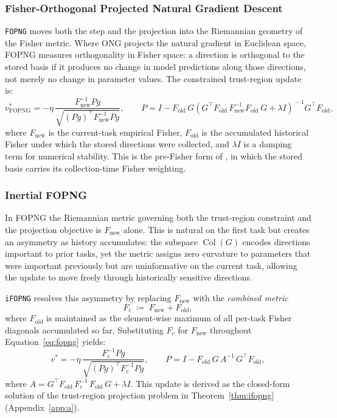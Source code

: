 \subsubsection{Fisher-Orthogonal Projected Natural Gradient Descent}
\texttt{FOPNG} \citep{garg_fisher-orthogonal_2026} moves both the step
and the projection into the Riemannian geometry of the Fisher metric.
Where ONG projects the natural gradient in Euclidean space, FOPNG measures
orthogonality in Fisher space: a direction is orthogonal to the stored
basis if it produces no change in model predictions along those directions,
not merely no change in parameter values.
The constrained trust-region update is:
\begin{equation}
    v^*_{\mathrm{FOPNG}} = -\eta\,
    \frac{F^{-1}_{\mathrm{new}} Pg}{\sqrt{(Pg)^\top F^{-1}_{\mathrm{new}} Pg}},
    \qquad
    P = I - F_{\mathrm{old}}\, G\!\left(G^\top F_{\mathrm{old}}\,
        F^{-1}_{\mathrm{new}} F_{\mathrm{old}}\, G
        + \lambda I\right)^{\!-1}\! G^\top F_{\mathrm{old}},
    \label{eq:fopng}
\end{equation}
where $F_{\mathrm{new}}$ is the current-task empirical Fisher,
$F_{\mathrm{old}}$ is the accumulated historical Fisher under which the
stored directions were collected, and $\lambda I$ is a damping term for
numerical stability.
This is the pre-Fisher form of \citet{garg_fisher-orthogonal_2026}, in
which the stored basis carries its collection-time Fisher weighting.

\subsubsection{Inertial FOPNG}
\label{sec:ifopng}

In FOPNG the Riemannian metric governing both the trust-region constraint
and the projection objective is $F_{\mathrm{new}}$ alone.
This is natural on the first task but creates an asymmetry as history
accumulates: the subspace $\operatorname{Col}(G)$ encodes directions
important to prior tasks, yet the metric assigns zero curvature to
parameters that were important previously but are uninformative on the
current task, allowing the update to move freely through historically
sensitive directions.

\texttt{iFOPNG} resolves this asymmetry by replacing $F_{\mathrm{new}}$
with the \emph{combined metric}
\begin{equation}
    F_c \;\coloneqq\; F_{\mathrm{new}} + F_{\mathrm{old}},
    \label{eq:combined_fisher}
\end{equation}
where $F_{\mathrm{old}}$ is maintained as the element-wise maximum of all
per-task Fisher diagonals accumulated so far.
Substituting $F_c$ for $F_{\mathrm{new}}$ throughout
Equation~\eqref{eq:fopng} yields:
\begin{equation}
    v^* = -\eta\,
    \frac{F_c^{-1}Pg}{\sqrt{(Pg)^\top F_c^{-1}Pg}},
    \qquad
    P = I - F_{\mathrm{old}}\,G\,A^{-1}\,G^\top F_{\mathrm{old}},
    \label{eq:ifopng}
\end{equation}
where $A = G^\top F_{\mathrm{old}}\,F_c^{-1}\,F_{\mathrm{old}}\,G
+ \lambda I$.
This update is derived as the closed-form solution of the trust-region
projection problem in Theorem~\ref{thm:ifopng}
(Appendix~\ref{app:a}).

